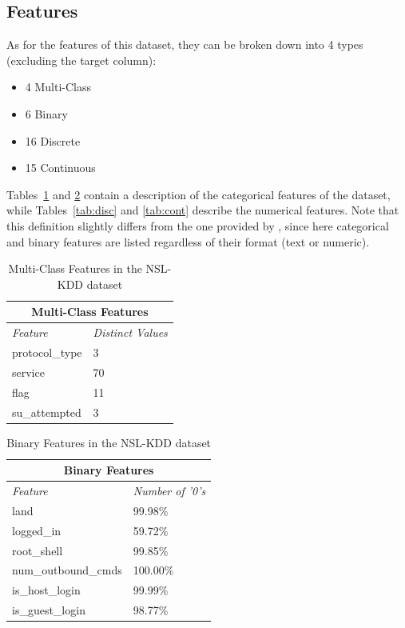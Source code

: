 \subsection{Features}
            
As for the features of this dataset, they can be broken down into 4 types (excluding the target column):

\begin{itemize}
    \item 4 Multi-Class
    \item 6 Binary
    \item 16 Discrete
    \item 15 Continuous
\end{itemize}

Tables~\ref{tab:cat} and \ref{tab:bin} contain a description of the categorical features of the dataset, while Tables~\ref{tab:disc} and \ref{tab:cont} describe the numerical features. Note that this definition slightly differs from the one provided by \cite{nslkdd}, since here categorical and binary features are listed regardless of their format (text or numeric). 
\begin{table}[]
    \centering
    \begin{tabular}{|l|l|}
    \hline
    \multicolumn{2}{|c|}{\textbf{Multi-Class Features}} \\ \hline
    \textit{Feature}     & \textit{Distinct Values} \\ \hline
    protocol\_type        & 3                \\ \hline
    service               & 70               \\ \hline
    flag                  & 11               \\ \hline
    su\_attempted	      & 3                \\ \hline
    \end{tabular}
    \caption{Multi-Class Features in the NSL-KDD dataset}
    \label{tab:cat}
\end{table}

\begin{table}[]
    \centering
    \begin{tabular}{|l|l|}
    \hline
    \multicolumn{2}{|c|}{\textbf{Binary Features}} \\ \hline
    \textit{Feature}     & \textit{Number of '0's} \\ \hline
    land	 & 99.98\%	 \\ \hline
    logged\_in	 & 59.72\%	 \\ \hline
    root\_shell	 & 99.85\%	 \\ \hline
    num\_outbound\_cmds	 & 100.00\%	 \\ \hline
    is\_host\_login	 & 99.99\%	 \\ \hline
    is\_guest\_login	 & 98.77\%	 \\ \hline
    \end{tabular}
    \caption{Binary Features in the NSL-KDD dataset}
    \label{tab:bin}
\end{table}


